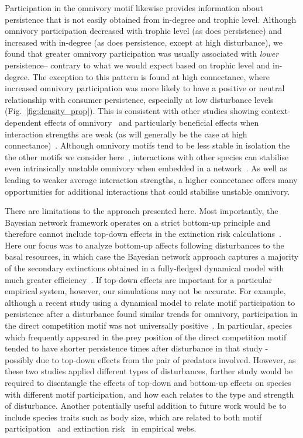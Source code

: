 \documentclass[12pt]{article}
\begin{document}
\begin{spacing}{1.0}
    Participation in the omnivory motif likewise provides information about persistence that is not easily obtained from in-degree and trophic level.
    Although omnivory participation decreased with trophic level (as does persistence) and increased with in-degree (as does persistence, except at high disturbance), we found that greater omnivory participation was usually associated with \emph{lower} persistence-- contrary to what we would expect based on trophic level and in-degree.
    The exception to this pattern is found at high connectance, where increased omnivory participation was more likely to have a positive or neutral relationship with consumer persistence, especially at low disturbance levels (Fig.~\ref{fig:density_prop}).
    This is consistent with other studies showing context-dependent effects of omnivory~\citep{bascompte2005simple, Monteiro2016} and particularly beneficial effects when interaction strengths are weak (as will generally be the case at high connectance)~\citep{Emmerson2004}.
    Although omnivory motifs tend to be less stable in isolation the the other motifs we consider here~\citep{Borrelli2015a}, interactions with other species can stabilise even intrinsically unstable omnivory when embedded in a network~\citep{Kratina2012}.
    As well as leading to weaker average interaction strengths, a higher connectance offers many opportunities for additional interactions that could stabilise unstable omnivory.
    

    There are limitations to the approach presented here.
    Most importantly, the Bayesian network framework operates on a strict bottom-up principle and therefore cannot include top-down effects in the extinction risk calculations~\citep{Eklof2013}. 
    Here our focus was to analyze bottom-up affects following disturbances to the basal resources, in which case the Bayesian network approach captures a majority of the secondary extinctions obtained in a fully-fledged dynamical model with much greater efficiency~\citep{Eklof2013}.
    If top-down effects are important for a particular empirical system, however, our simulations may not be accurate. 
    For example, although a recent study using a dynamical model to relate motif participation to persistence after a disturbance found similar trends for omnivory, participation in the direct competition motif was not universally positive~\citep{Cirtwill2022Oikos}.
    In particular, species which frequently appeared in the prey position of the direct competition motif tended to have shorter persistence times after disturbance in that study - possibly due to top-down effects from the pair of predators involved.
    However, as these two studies applied different types of disturbances, further study would be required to disentangle the effects of top-down and bottom-up effects on species with different motif participation, and how each relates to the type and strength of disturbance.
    Another potentially useful addition to future work would be to include species traits such as body size, which are related to both motif participation~\citep{cirtwill2018feeding} and extinction risk~\citep{Brose2017,Cardillo2005,Purvis2000} in empirical webs.
    

\end{spacing}
\end{document}

